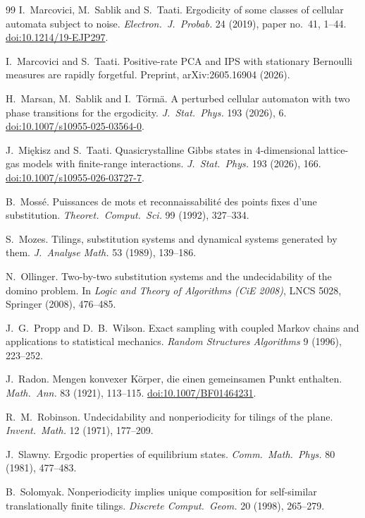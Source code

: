 \begin{thebibliography}{99}
 I.~Marcovici, M.~Sablik and S.~Taati. Ergodicity of some classes of cellular automata subject to noise. \emph{Electron.\ J.\ Probab.} 24 (2019), paper no.~41, 1--44. \href{https://doi.org/10.1214/19-EJP297}{doi:10.1214/19-EJP297}.

 I.~Marcovici and S.~Taati. Positive-rate PCA and IPS with stationary Bernoulli measures are rapidly forgetful. Preprint, arXiv:2605.16904 (2026).

 H.~Marsan, M.~Sablik and I.~T\"orm\"a. A perturbed cellular automaton with two phase transitions for the ergodicity. \emph{J.\ Stat.\ Phys.} 193 (2026), 6. \href{https://doi.org/10.1007/s10955-025-03564-0}{doi:10.1007/s10955-025-03564-0}.

 J.~Mi\k{e}kisz and S.~Taati. Quasicrystalline Gibbs states in 4-dimensional lattice-gas models with finite-range interactions. \emph{J.\ Stat.\ Phys.} 193 (2026), 166. \href{https://doi.org/10.1007/s10955-026-03727-7}{doi:10.1007/s10955-026-03727-7}.

 B.~Moss\'e. Puissances de mots et reconnaissabilit\'e des points fixes d'une substitution. \emph{Theoret.\ Comput.\ Sci.} 99 (1992), 327--334.

 S.~Mozes. Tilings, substitution systems and dynamical systems generated by them. \emph{J.\ Analyse Math.} 53 (1989), 139--186.

 N.~Ollinger. Two-by-two substitution systems and the undecidability of the domino problem. In \emph{Logic and Theory of Algorithms (CiE 2008)}, LNCS 5028, Springer (2008), 476--485.

 J.~G.~Propp and D.~B.~Wilson. Exact sampling with coupled Markov chains and applications to statistical mechanics. \emph{Random Structures Algorithms} 9 (1996), 223--252.

 J.~Radon. Mengen konvexer K\"orper, die einen gemeinsamen Punkt enthalten. \emph{Math.\ Ann.} 83 (1921), 113--115. \href{https://doi.org/10.1007/BF01464231}{doi:10.1007/BF01464231}.

 R.~M.~Robinson. Undecidability and nonperiodicity for tilings of the plane. \emph{Invent.\ Math.} 12 (1971), 177--209.

 J.~Slawny. Ergodic properties of equilibrium states. \emph{Comm.\ Math.\ Phys.} 80 (1981), 477--483.

 B.~Solomyak. Nonperiodicity implies unique composition for self-similar translationally finite tilings. \emph{Discrete Comput.\ Geom.} 20 (1998), 265--279.


\end{thebibliography}
